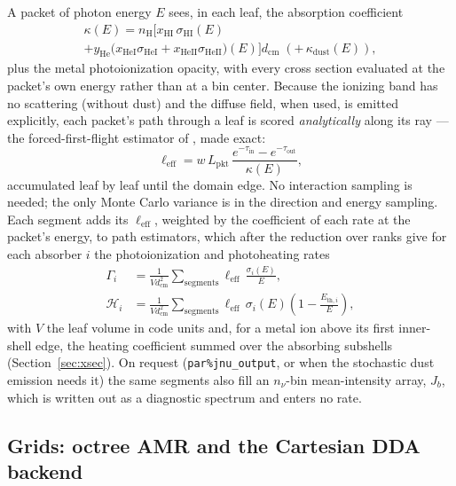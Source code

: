 \documentclass[twocolumn,linenumbers]{aastex702}
\newcommand{\code}[1]{\texttt{#1}}
\newcommand{\nH}{n_{\mathrm{H}}}
\newcommand{\xHI}{x_{\mathrm{HI}}}
\begin{document}
A packet of photon energy $E$ sees, in each leaf, the absorption coefficient
\begin{multline}
  \kappa(E) = \nH\big[\xHI\,\sigma_{\mathrm{HI}}(E) \\
   + y_{\mathrm{He}}\big(x_{\mathrm{HeI}}\sigma_{\mathrm{HeI}} +
     x_{\mathrm{HeII}}\sigma_{\mathrm{HeII}}\big)(E)\big] d_{\mathrm{cm}}
   \;(+\,\kappa_{\mathrm{dust}}(E)),
\end{multline}%
plus the metal photoionization opacity, with every cross section evaluated
at the packet's own energy rather than at a bin center.  Because the
ionizing band has no scattering (without dust) and the diffuse field, when
used, is emitted explicitly, each packet's path through a leaf is scored
\emph{analytically} along its ray --- the forced-first-flight estimator of
\citet{lucy1999}, made exact:
\begin{equation}
  \ell_{\mathrm{eff}} = w\,L_{\mathrm{pkt}}\,
  \frac{e^{-\tau_{\mathrm{in}}} - e^{-\tau_{\mathrm{out}}}}{\kappa(E)},
  \label{eq:edgewalk}
\end{equation}%
accumulated leaf by leaf until the domain edge.  No interaction sampling
is needed; the only Monte Carlo variance is in the direction and energy
sampling.  Each segment adds its $\ell_{\mathrm{eff}}$, weighted by the
coefficient of each rate at the packet's energy, to path estimators, which
after the reduction over ranks give for each absorber $i$ the
photoionization and photoheating rates
\begin{align}
  \Gamma_i &= \frac{1}{V d_{\mathrm{cm}}^2}\sum_{\mathrm{segments}}
  \ell_{\mathrm{eff}}\,\frac{\sigma_i(E)}{E},
  \nonumber\\
  \mathcal{H}_i &= \frac{1}{V d_{\mathrm{cm}}^2}\sum_{\mathrm{segments}}
  \ell_{\mathrm{eff}}\,\sigma_i(E)
  \left(1 - \frac{E_{\mathrm{th},i}}{E}\right),
  \label{eq:rates}
\end{align}
with $V$ the leaf volume in code units and, for a metal ion above its first
inner-shell edge, the heating coefficient summed over the absorbing
subshells (Section~\ref{sec:xsec}).  On request (\code{par\%jnu\_output},
or when the stochastic dust emission needs it) the same segments also fill
an $n_\nu$-bin mean-intensity array, $J_b$, which is written out as a
diagnostic spectrum and enters no rate.

\subsection{Grids: octree AMR and the Cartesian DDA backend}
\label{sec:grids}
\end{document}
